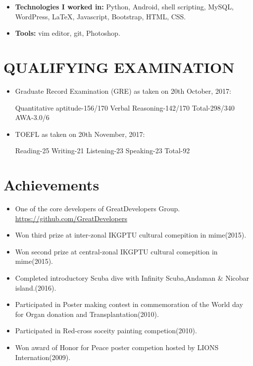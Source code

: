 \documentclass[10.1pt,a4paper,sans]{moderncv}        %
\begin{document}
\begin{itemize}

\item \textbf{Technologies I worked in:} Python, Android, shell scripting, MySQL, WordPress, LaTeX, Javascript, Bootstrap, HTML, CSS.

\item \textbf{Tools:} vim editor, git, Photoshop.
\end{itemize}

\section{QUALIFYING EXAMINATION}

\vspace{3pt}

\begin{itemize}

\item Graduate Record Examination (GRE) as taken on 20th October, 2017:

Quantitative aptitude-156/170 Verbal Reasoning-142/170 Total-298/340 AWA-3.0/6 

\item  TOEFL as taken on 20th November, 2017:

Reading-25 Writing-21 Listening-23 Speaking-23 Total-92


\end{itemize}

\section{Achievements}

\vspace{3pt}

\begin{itemize}

\item One of the core developers of GreatDevelopers Group. \href{https://github.com/orgs/GreatDevelopers/people}{https://github.com/GreatDevelopers}
\item Won third prize at inter-zonal IKGPTU cultural comepition in mime(2015). 
\item Won second prize at central-zonal IKGPTU cultural comepition in mime(2015).
\item Completed introductory Scuba dive with Infinity Scuba,Andaman & Nicobar island.(2016).
\item Participated in Poster making contest in commemoration of the World day for Organ donation and Transplantation(2010).
\item Participated in Red-cross soceity painting competion(2010).
\item Won award of Honor for Peace poster competion hosted by LIONS Internation(2009).


\end{itemize}
\end{document}
